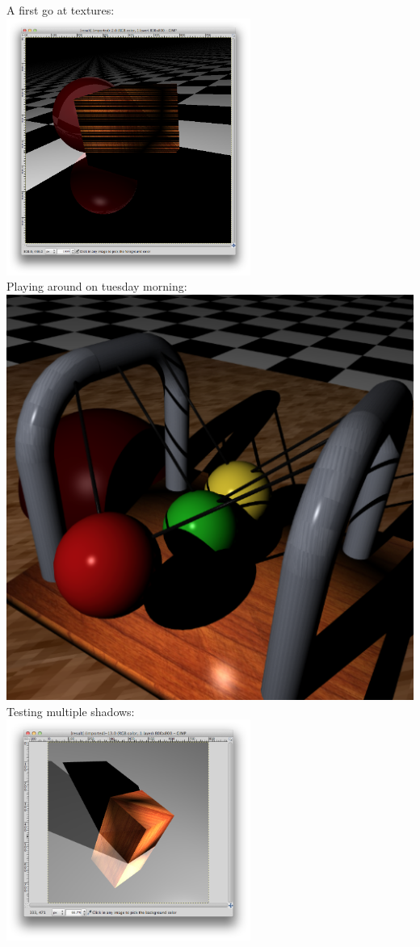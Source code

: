 \documentclass[a4paper,11pt]{article}
\begin{document}
A first go at textures:\\
\includegraphics[keepaspectratio,width=8.0cm]{images/texture}\\

\newpage Playing around on tuesday morning:\\
\includegraphics[scale=0.5]{images/playing}\\

Testing multiple shadows:\\
\includegraphics[keepaspectratio,width=8.0cm]{images/mshadow}\\
\end{document}
